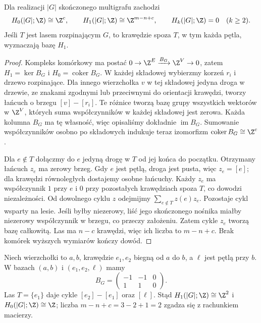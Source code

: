 \begin{twierdzenie}
\label{thm:homologia-grafu-incydencja}
Dla realizacji $|G|$ skończonego multigrafu zachodzi
\[
 H_0(|G|;\Z)\cong\Z^c,\qquad
 H_1(|G|;\Z)\cong\Z^{m-n+c},\qquad
 H_k(|G|;\Z)=0\quad(k\geq2).
\]
Jeśli $T$ jest lasem rozpinającym $G$, to krawędzie
spoza $T$, w tym każda pętla, wyznaczają bazę $H_1$.
\end{twierdzenie}
\begin{proof}
Kompleks komórkowy ma postać
$0\to\Z^E\xrightarrow{B_G}\Z^V\to0$,
zatem $H_1=\ker B_G$ i $H_0=\operatorname{coker}B_G$.
W każdej składowej wybierzmy korzeń $r_i$ i drzewo
rozpinające. Dla innego wierzchołka $v$ w tej składowej
jedyna droga w drzewie, ze znakami zgodnymi lub przeciwnymi
do orientacji krawędzi, tworzy łańcuch o brzegu
$[v]-[r_i]$. Te różnice tworzą bazę grupy wszystkich
wektorów w $\Z^V$, których suma współczynników w każdej
składowej jest zerowa. Każda kolumna $B_G$ ma tę własność,
więc opisaliśmy dokładnie $\operatorname{im}B_G$.
Sumowanie współczynników osobno po składowych indukuje
teraz izomorfizm $\operatorname{coker}B_G\cong\Z^c$.

Dla $e\notin T$ dołączmy do $e$ jedyną drogę w $T$
od jej końca do początku. Otrzymany łańcuch $z_e$
ma zerowy brzeg. Gdy $e$ jest pętlą, droga jest pusta,
więc $z_e=[e]$; dla krawędzi równoległych dostajemy
osobne łańcuchy. Każdy $z_e$ ma współczynnik $1$ przy
$e$ i $0$ przy pozostałych krawędziach spoza $T$,
co dowodzi niezależności. Od dowolnego cyklu $z$
odejmijmy $\sum_{e\notin T}z(e)z_e$.
Pozostaje cykl wsparty na lesie. Jeśli byłby niezerowy,
liść jego skończonego nośnika miałby niezerowy
współczynnik w brzegu, co przeczy założeniu.
Zatem cykle $z_e$ tworzą bazę całkowitą. Las ma
$n-c$ krawędzi, więc ich liczba to $m-n+c$.
Brak komórek wyższych wymiarów kończy dowód.
\end{proof}

\begin{przyklad}
Niech wierzchołki to $a,b$, krawędzie $e_1,e_2$
biegną od $a$ do $b$, a $\ell$ jest pętlą przy $b$.
W bazach $(a,b)$ i $(e_1,e_2,\ell)$ mamy
\[
 B_G=\begin{pmatrix}-1&-1&0\\1&1&0\end{pmatrix}.
\]
Las $T=\{e_1\}$ daje cykle $[e_2]-[e_1]$ oraz
$[\ell]$. Stąd $H_1(|G|;\Z)\cong\Z^2$ i
$H_0(|G|;\Z)\cong\Z$; liczba $m-n+c=3-2+1=2$
zgadza się z rachunkiem macierzy.
\end{przyklad}

